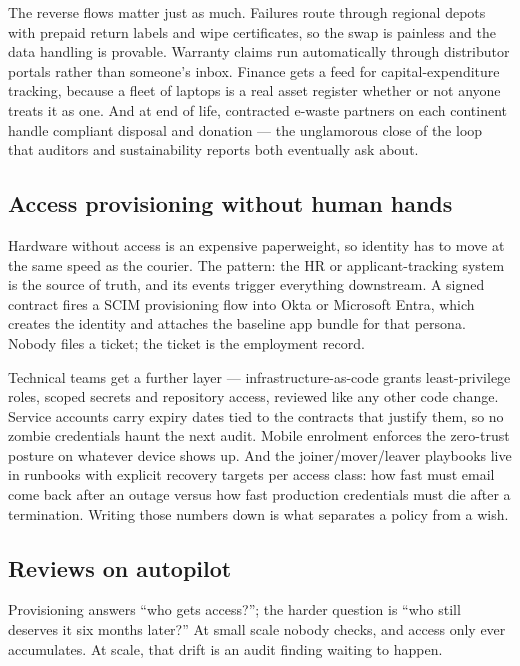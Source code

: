 The reverse flows matter just as much. Failures route through regional depots with prepaid return labels and wipe certificates, so the swap is painless and the data handling is provable. Warranty claims run automatically through distributor portals rather than someone's inbox. Finance gets a feed for capital-expenditure tracking, because a fleet of laptops is a real asset register whether or not anyone treats it as one. And at end of life, contracted e-waste partners on each continent handle compliant disposal and donation — the unglamorous close of the loop that auditors and sustainability reports both eventually ask about.



\subsection{Access provisioning without human hands}


Hardware without access is an expensive paperweight, so identity has to move at the same speed as the courier. The pattern: the HR or applicant-tracking system is the source of truth, and its events trigger everything downstream. A signed contract fires a SCIM provisioning flow into Okta or Microsoft Entra, which creates the identity and attaches the baseline app bundle for that persona. Nobody files a ticket; the ticket is the employment record.


Technical teams get a further layer — infrastructure-as-code grants least-privilege roles, scoped secrets and repository access, reviewed like any other code change. Service accounts carry expiry dates tied to the contracts that justify them, so no zombie credentials haunt the next audit. Mobile enrolment enforces the zero-trust posture on whatever device shows up. And the joiner/mover/leaver playbooks live in runbooks with explicit recovery targets per access class: how fast must email come back after an outage versus how fast production credentials must die after a termination. Writing those numbers down is what separates a policy from a wish.



\subsection{Reviews on autopilot}


Provisioning answers ``who gets access?''; the harder question is ``who still deserves it six months later?'' At small scale nobody checks, and access only ever accumulates. At scale, that drift is an audit finding waiting to happen.


